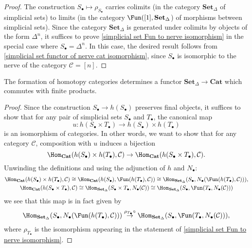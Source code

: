 \begin{proof}
The construction $S_\bullet\mapsto\rho_{S_\bullet}$ carries colimits (in the category $\mathbf{Set}_\Delta$ of simplicial sets) to limits (in the category $\Fun([1],\mathbf{Set}_\Delta$) of morphisms between simplicial sets). Since the category $\mathbf{Set}_\Delta$ is generated under colimits by objects of the form $\Delta^n$, it suffices to prove \cref{simplicial set Fun to nerve isomorphism} in the special case where $S_\bullet=\Delta^n$. In this case, the desired result follows from \cref{simplicial set functor of nerve cat isomorphism}, since $S_\bullet$ is isomorphic to the nerve of the category $\mathcal{C}=[n]$.
\end{proof}
\begin{corollary}\label{simplicial set homotopy cat functor finite product}
The formation of homotopy categories determines a functor $\mathbf{Set}_\Delta\to\mathbf{Cat}$ which commutes with finite products.
\end{corollary}
\begin{proof}
Since the construction $S_\bullet\to h(S_\bullet)$ preserves final objects, it suffices to show that for any pair of simplicial sets $S_\bullet$ and $T_\bullet$, the canonical map
\[u:h(S_\bullet\times T_\bullet)\to h(S_\bullet)\times h(T_\bullet)\]
is an isomorphism of categories. In other words, we want to show that for any category $\mathcal{C}$, composition with $u$ induces a bijection
\[\Hom_{\mathbf{Cat}}(h(S_\bullet)\times h(T_\bullet),\mathcal{C})\to\Hom_{\mathbf{Cat}}(h(S_\bullet\times T_\bullet),\mathcal{C}).\]
Unwinding the definitions and using the adjunction of $h$ and $N_\bullet$:
\begin{gather*}
\Hom_{\mathbf{Cat}}(h(S_\bullet)\times h(T_\bullet),\mathcal{C})\cong\Hom_{\mathbf{Cat}}(h(S_\bullet),\Fun(h(T_\bullet),\mathcal{C}))\cong \Hom_{\mathbf{Set}_\Delta}(S_\bullet,N_\bullet(\Fun(h(T_\bullet),\mathcal{C}))),\\
\Hom_{\mathbf{Cat}}(h(S_\bullet\times T_\bullet),\mathcal{C})\cong\Hom_{\mathbf{Set}_\Delta}(S_\bullet\times T_\bullet,N_\bullet(\mathcal{C}))\cong\Hom_{\mathbf{Set}_\Delta}(S_\bullet,\Fun(T_\bullet,N_\bullet(\mathcal{C})))
\end{gather*}
we see that this map is in fact given by
\begin{align*}
\Hom_{\mathbf{Set}_\Delta}(S_\bullet,N_\bullet(\Fun(h(T_\bullet),\mathcal{C})))\stackrel{\rho_{T_\bullet}\circ}{\to}\Hom_{\mathbf{Set}_\Delta}(S_\bullet,\Fun(T_\bullet,N_\bullet(\mathcal{C}))),
\end{align*}
where $\rho_{T_\bullet}$ is the isomorphism appearing in the statement of \cref{simplicial set Fun to nerve isomorphism}.
\end{proof}
